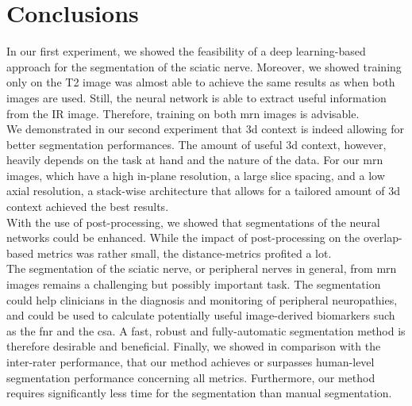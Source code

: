 \section{Conclusions} \label{disc:conclusions}
In our first experiment, we showed the feasibility of a deep learning-based approach for the segmentation of the sciatic nerve. Moreover, we showed training only on the T2 image was almost able to achieve the same results as when both images are used. Still, the neural network is able to extract useful information from the IR image. Therefore, training on both \gls{mrn} images is advisable.\\
We demonstrated in our second experiment that \gls{3d} context is indeed allowing for better segmentation performances. The amount of useful \gls{3d} context, however, heavily depends on the task at hand and the nature of the data. For our \gls{mrn} images, which have a high in-plane resolution, a large slice spacing, and a low axial resolution, a stack-wise architecture that allows for a tailored amount of \gls{3d} context achieved the best results.\\
With the use of post-processing, we showed that segmentations of the neural networks could be enhanced. While the impact of post-processing on the overlap-based metrics was rather small, the distance-metrics profited a lot.\\
The segmentation of the sciatic nerve, or peripheral nerves in general, from \gls{mrn} images remains a challenging but possibly important task. The segmentation could help clinicians in the diagnosis and monitoring of peripheral neuropathies, and could be used to calculate potentially useful image-derived biomarkers such as the \gls{fnr} and the \gls{csa}. A fast, robust and fully-automatic segmentation method is therefore desirable and beneficial. Finally, we showed in comparison with the inter-rater performance, that our method achieves or surpasses human-level segmentation performance concerning all metrics. Furthermore, our method requires significantly less time for the segmentation than manual segmentation.

\endinput